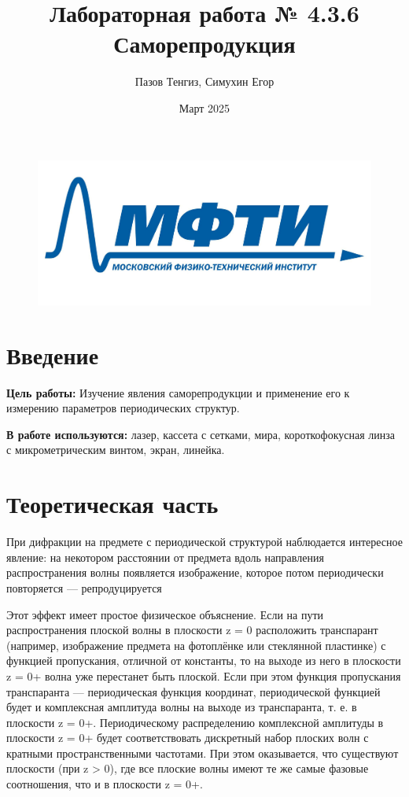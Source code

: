 \documentclass[a4paper,12pt]{article}
\title{Лабораторная работа № 4.3.6\\Саморепродукция}
\author{Пазов Тенгиз, Симухин Егор}
\date{Март 2025}
\begin{document}
\maketitle
\begin{figure}[h!]
\centering
\includegraphics[scale=0.25]{MIPT.jpg}
\end{figure}
\newpage
\section*{Введение}
\textbf{Цель работы:} Изучение явления саморепродукции и применение его к измерению параметров периодических структур.

\textbf{В работе используются:} лазер, кассета с сетками, мира, короткофокусная линза с микрометрическим винтом, экран, линейка.

\section{Теоретическая часть}
При дифракции на предмете с периодической структурой наблюдается интересное явление: на некотором расстоянии от предмета вдоль направления распространения волны появляется изображение, которое потом периодически повторяется — репродуцируется

Этот эффект имеет простое физическое объяснение. Если на
пути распространения плоской волны в плоскости z = 0 расположить транспарант (например, изображение предмета на фотоплёнке или стеклянной пластинке) с функцией пропускания, отличной от константы, то на выходе из него в плоскости z = 0+
волна уже перестанет быть плоской. Если при этом функция пропускания транспаранта — периодическая функция координат, периодической функцией будет и комплексная амплитуда волны на
выходе из транспаранта, т. е. в плоскости z = 0+. Периодическому распределению комплексной амплитуды в плоскости z = 0+
будет соответствовать дискретный набор плоских волн с кратными пространственными частотами. При этом оказывается, что существуют плоскости (при z > 0), где все плоские волны имеют
те же самые фазовые соотношения, что и в плоскости z = 0+.
\end{document}
